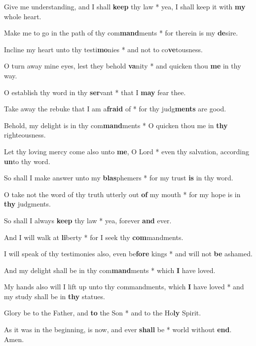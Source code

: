 \begin{multicols}{2}
	Give me understanding, and I shall \textbf{keep} thy law * yea, I shall keep it with \textbf{my} whole heart.
	
	Make me to go in the path of thy com\textbf{mand}ments * for therein is my \textbf{de}sire.
	
	Incline my heart unto thy testi\textbf{mo}nies * and not to co\textbf{ve}tousness.
	
	O turn away mine eyes, lest they behold \textbf{va}nity * and quicken thou \textbf{me} in thy way.
	
	O establish thy word in thy \textbf{ser}vant * that I \textbf{may} fear thee.
	
	Take away the rebuke that I am a\textbf{fraid} of * for thy judg\textbf{ments} are good.
	
	Behold, my delight is in thy com\textbf{mand}ments * O quicken thou me in \textbf{thy} righteousness.
	
	Let thy loving mercy come also unto \textbf{me}, O Lord * even thy salvation, according \textbf{un}to thy word.
	
	So shall I make answer unto my \textbf{blas}phemers * for my trust \textbf{is} in thy word.
	
	O take not the word of thy truth utterly out \textbf{of} my mouth * for my hope is in \textbf{thy} judgments.
	
	So shall I always \textbf{keep} thy law * yea, forever \textbf{and} ever.
	
	And I will walk at \textbf{li}berty * for I seek thy \textbf{com}mandments.
	
	I will speak of thy testimonies also, even be\textbf{fore} kings * and will not \textbf{be} ashamed.
	
	And my delight shall be in thy com\textbf{mand}ments * which \textbf{I} have loved.
	
	My hands also will I lift up unto thy commandments, which \textbf{I} have loved * and my study shall be in \textbf{thy} statues.
	
	Glory be to the Father, and \textbf{to} the Son * and to the Ho\textbf{ly} Spirit.
	
	As it was in the beginning, is now, and ever \textbf{shall} be * world without \textbf{end}. Amen.
\end{multicols}